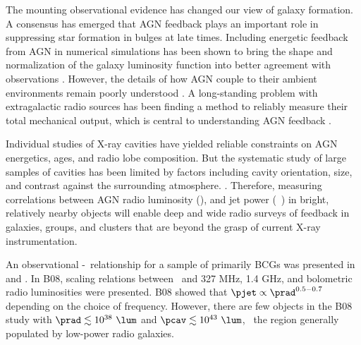 \documentclass{emulateapj}
\begin{document}
The mounting observational evidence has changed our view of galaxy
formation.  A consensus has emerged that AGN feedback plays an
important role in suppressing star formation in bulges at late
times. Including energetic feedback from AGN in numerical simulations
has been shown to bring the shape and normalization of the galaxy
luminosity function into better agreement with observations
\citep{croton06, bower06, saro06, sijacki07}. However, the details of
how AGN couple to their ambient 
environments remain poorly understood \citep{2008ASPC..386..343D,
2009arXiv0910.3691M}.  A long-standing problem with extragalactic
radio sources has been finding a method to reliably measure their total
mechanical output, which is central to understanding AGN feedback
\citep[\eg][]{1991Natur.349..138R, 1996AJ....112....9L}.

Individual studies of X-ray cavities have yielded reliable constraints on
AGN energetics, ages, and radio lobe composition. But the systematic study of
large samples of cavities has been limited by factors
including cavity orientation, size, and contrast against the surrounding
atmosphere.
\citep{2009arXiv0909.0397B}. Therefore, measuring
correlations between AGN radio luminosity
(\prad), and jet power (\eg\ \pjet) in bright, relatively nearby objects will
enable deep and wide radio surveys of feedback in galaxies, groups,
and clusters that are beyond the grasp of current X-ray instrumentation.

An observational \pjet-\prad\ relationship for a sample of primarily
BCGs was presented in \citet[][hereafter B04]{birzan04} and
\citet[][hereafter B08]{birzan08}. In B08, scaling relations between
\pjet\ and 327 MHz, 1.4 GHz, and bolometric radio luminosities were
presented. B08 showed that $\pjet \propto \prad^{0.5-0.7}$ depending
on the choice of frequency. However, there are few objects in the B08
study with $\prad \lesssim 10^{38} ~\lum$ and $\pcav \lesssim 10^{43}
~\lum$, \ie\ the region generally populated by low-power radio galaxies.
\end{document}
